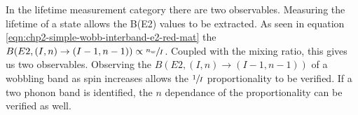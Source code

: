 In the lifetime measurement category there are two observables. Measuring the lifetime of a state allows the B(E2) values to be extracted. As seen in equation \ref{eqn:chp2-simple-wobb-interband-e2-red-mat} the $B(E2,(I,n)\rightarrow(I-1,n-1)) \propto \sfrac{n_w}{I}$. Coupled with the mixing ratio, this gives us two observables. Observing the $B(E2,(I,n)\rightarrow(I-1,n-1))$ of a wobbling band as spin increases allows the $\sfrac{1}{I}$ proportionality to be verified. If a two phonon band is identified, the $n$ dependance of the proportionality can be verified as well.

